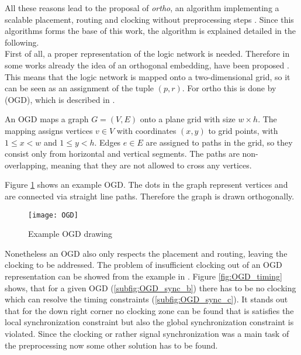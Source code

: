 All these reasons lead to the proposal of \textit{ortho}, an algorithm implementing a scalable placement, routing and clocking without preprocessing steps \cite{ortho}. Since this algorithms forms the base of this work, the algorithm is explained detailed in the following.\\
First of all, a proper representation of the logic network is needed. Therefore in some works already the idea of an orthogonal embedding, have been proposed \cite{dummy_and_buffer_nodes}. This means that the logic network is mapped onto a two-dimensional grid, so it can be seen as an assignment of the tuple $(p, r)$. For ortho this is done by  (OGD), which is described in \cite{OGD}.

\begin{definition}
	An OGD maps a graph $G = (V, E)$ onto a plane grid with size $w \times h$. The mapping assigns vertices $v \in V$ with coordinates $(x, y)$ to grid points, with $1 \leq x < w$ and $1 \leq y < h$. Edges $e \in E$ are assigned to paths in the grid, so they consist only from horizontal and vertical segments. The paths are non-overlapping, meaning that they are not allowed to cross any vertices.
\end{definition}

Figure \ref{fig:OGD_example} shows an example OGD. The dots in the graph represent vertices and are connected via straight line paths. Therefore the graph is drawn orthogonally.

\begin{figure}
	\centering
	\texttt{[image: OGD]}
	\caption{Example OGD drawing}\label{fig:OGD_example}
\end{figure}

Nonetheless an OGD also only respects the placement and routing, leaving the clocking to be addressed. The problem of insufficient clocking out of an OGD representation can be showed from the example in \cite{Walter}. Figure \ref{fig:OGD_timing} shows, that for a given OGD (\ref{subfig:OGD_sync_b}) there has to be no clocking which can resolve the timing constraints (\ref{subfig:OGD_sync_c}). It stands out that for the down right corner no clocking zone can be found that is satisfies the local synchronization constraint but also the global synchronization constraint is violated. Since the clocking or rather signal synchronization was a main task of the preprocessing now some other solution has to be found.

